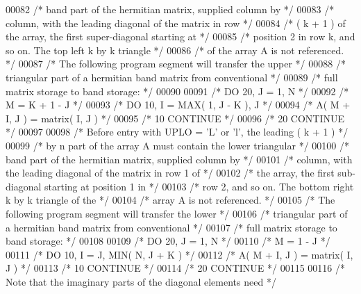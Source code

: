 \begin{DoxyCode}
00082 \textcolor{comment}{/*           band part of the hermitian matrix, supplied column by */}
00083 \textcolor{comment}{/*           column, with the leading diagonal of the matrix in row */}
00084 \textcolor{comment}{/*           ( k + 1 ) of the array, the first super-diagonal starting at */}
00085 \textcolor{comment}{/*           position 2 in row k, and so on. The top left k by k triangle */}
00086 \textcolor{comment}{/*           of the array A is not referenced. */}
00087 \textcolor{comment}{/*           The following program segment will transfer the upper */}
00088 \textcolor{comment}{/*           triangular part of a hermitian band matrix from conventional */}
00089 \textcolor{comment}{/*           full matrix storage to band storage: */}
00090 
00091 \textcolor{comment}{/*                 DO 20, J = 1, N */}
00092 \textcolor{comment}{/*                    M = K + 1 - J */}
00093 \textcolor{comment}{/*                    DO 10, I = MAX( 1, J - K ), J */}
00094 \textcolor{comment}{/*                       A( M + I, J ) = matrix( I, J ) */}
00095 \textcolor{comment}{/*              10    CONTINUE */}
00096 \textcolor{comment}{/*              20 CONTINUE */}
00097 
00098 \textcolor{comment}{/*           Before entry with UPLO = 'L' or 'l', the leading ( k + 1 ) */}
00099 \textcolor{comment}{/*           by n part of the array A must contain the lower triangular */}
00100 \textcolor{comment}{/*           band part of the hermitian matrix, supplied column by */}
00101 \textcolor{comment}{/*           column, with the leading diagonal of the matrix in row 1 of */}
00102 \textcolor{comment}{/*           the array, the first sub-diagonal starting at position 1 in */}
00103 \textcolor{comment}{/*           row 2, and so on. The bottom right k by k triangle of the */}
00104 \textcolor{comment}{/*           array A is not referenced. */}
00105 \textcolor{comment}{/*           The following program segment will transfer the lower */}
00106 \textcolor{comment}{/*           triangular part of a hermitian band matrix from conventional */}
00107 \textcolor{comment}{/*           full matrix storage to band storage: */}
00108 
00109 \textcolor{comment}{/*                 DO 20, J = 1, N */}
00110 \textcolor{comment}{/*                    M = 1 - J */}
00111 \textcolor{comment}{/*                    DO 10, I = J, MIN( N, J + K ) */}
00112 \textcolor{comment}{/*                       A( M + I, J ) = matrix( I, J ) */}
00113 \textcolor{comment}{/*              10    CONTINUE */}
00114 \textcolor{comment}{/*              20 CONTINUE */}
00115 
00116 \textcolor{comment}{/*           Note that the imaginary parts of the diagonal elements need */}

\end{DoxyCode}
